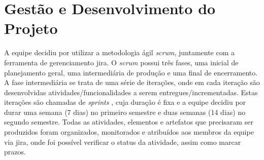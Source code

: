 \section{Gestão e Desenvolvimento do Projeto}
A equipe decidiu por utilizar a metodologia ágil \textit{\gls{scrum}}, juntamente com a ferramenta de gerenciamento \gls{jira}. O \textit{\gls{scrum}} possui três fases, uma inicial de planejamento geral, uma intermediária de produção e uma final de encerramento. A fase intermediária se trata de uma série de iterações, onde em cada iteração são desenvolvidas atividades/funcionalidades a serem entregues/incrementadas. Estas iterações são chamadas de \textit{\glspl{sprint}} \cite{sommerville}, cuja duração é fixa e a equipe decidiu por durar uma semana (7 dias) no primeiro semestre e duas semanas (14 dias) no segundo semestre. Todas as atividades, elementos e artefatos que precisaram ser produzidos foram organizados, monitorados e atribuídos aos membros da equipe via \gls{jira}, onde foi possível verificar o status da atividade, assim como marcar prazos.